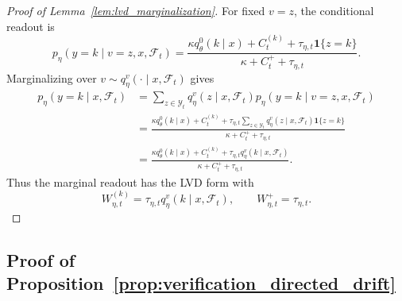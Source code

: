 \documentclass{article}
\newcommand{\lemref}[1]{Lemma~\ref{#1}}
\newcommand{\propref}[1]{Proposition~\ref{#1}}
\begin{document}
\begin{proof}[Proof of \lemref{lem:lvd_marginalization}]
For fixed $v=z$, the conditional readout is
\[
    p_\eta(y=k\mid v=z,x,\mathcal F_t)
    =
    \frac{
    \kappa q_\theta^0(k\mid x)+C_t^{(k)}
    +\tau_{\eta,t}\mathbf 1\{z=k\}
    }{
    \kappa+C_t^+ +\tau_{\eta,t}
    }.
\]
Marginalizing over $v\sim q_\eta^v(\cdot\mid x,\mathcal F_t)$ gives
\[
\begin{aligned}
    p_\eta(y=k\mid x,\mathcal F_t)
    &=
    \sum_{z\in\mathcal Y_t}
    q_\eta^v(z\mid x,\mathcal F_t)
    p_\eta(y=k\mid v=z,x,\mathcal F_t)\\
    &=
    \frac{
    \kappa q_\theta^0(k\mid x)+C_t^{(k)}
    +\tau_{\eta,t}
    \sum_{z\in\mathcal Y_t}
    q_\eta^v(z\mid x,\mathcal F_t)\mathbf 1\{z=k\}
    }{
    \kappa+C_t^+ +\tau_{\eta,t}
    }\\
    &=
    \frac{
    \kappa q_\theta^0(k\mid x)+C_t^{(k)}
    +\tau_{\eta,t}q_\eta^v(k\mid x,\mathcal F_t)
    }{
    \kappa+C_t^+ +\tau_{\eta,t}
    }.
\end{aligned}
\]
Thus the marginal readout has the LVD form with
\[
    W_{\eta,t}^{(k)}=\tau_{\eta,t}q_\eta^v(k\mid x,\mathcal F_t),
    \qquad
    W_{\eta,t}^+=\tau_{\eta,t}.
\]
\end{proof}

\subsection{Proof of \propref{prop:verification_directed_drift}}
\label{app:proof_verification_directed_drift}
\end{document}

